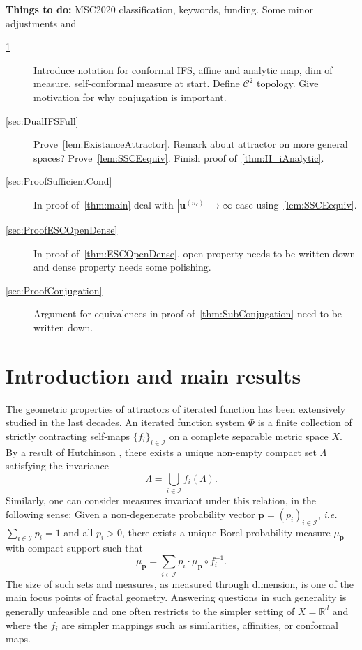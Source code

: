 \documentclass[12pt,]{article}
\theoremstyle{definition}
\theoremstyle{remark}
\newcommand{\0}{\mathbf{0}}
\newcommand{\ie}{{\it i.e.}\/ }
\newcommand{\bu}{\mathbf{u}}
\begin{document}
{{\color{blue}
\textbf{Things to do:}
MSC2020 classification, keywords, funding. Some minor adjustments and
\begin{description}
\item[\cref{sec:intro}] Introduce notation for conformal IFS, affine and analytic map, dim of measure, self-conformal measure at start. Define $\mathcal{C}^2$ topology. Give motivation for why conjugation is important. 
\item[\cref{sec:DualIFSFull}] Prove~\cref{lem:ExistanceAttractor}. Remark about attractor on more general spaces? Prove~\cref{lem:SSCEequiv}. Finish proof of~\cref{thm:H_iAnalytic}. 
\item[\cref{sec:ProofSufficientCond}] In proof of~\cref{thm:main} deal with $|\bu^{(n_\ell)}| \to \infty$ case using~\cref{lem:SSCEequiv}.
\item[\cref{sec:ProofESCOpenDense}] In proof of~\cref{thm:ESCOpenDense}, open property needs to be written down and dense property needs some polishing.
\item[\cref{sec:ProofConjugation}] Argument for equivalences in proof of~\cref{thm:SubConjugation} need to be written down.
\end{description}
}


%
%

\section{Introduction and main results} \label{sec:intro}
The geometric properties of attractors of iterated function has been extensively studied in the last
decades.
An iterated function system $\Phi$ is a finite collection of strictly contracting self-maps
$\{f_i\}_{i\in\mathcal{I}}$ on a complete separable metric space $X$. By a result of Hutchinson
\cite{Hutchinson_Attractor_81}, there exists a unique non-empty compact set $\Lambda$ satisfying the
invariance
\begin{equation}\label{eq:Hutchinson}
  \Lambda = \bigcup_{i\in\mathcal{I}} f_i(\Lambda).
\end{equation}
Similarly, one can consider measures invariant under this relation, in the following sense:
Given a non-degenerate probability vector $\mathbf{p}=(p_i)_{i\in\mathcal{I}}$, \ie
$\sum_{i\in\mathcal{I}}p_i=1$ and all $p_i>0$, there exists a unique Borel probability measure
$\mu_{\mathbf{p}}$ with compact support such that
\begin{equation*}
\mu_{\mathbf{p}}=\sum_{i \in \mathcal{I}} p_i \cdot \mu_{\mathbf{p}} \circ f_i^{-1}.
\end{equation*}
The size of such sets and measures, as measured through dimension, is one of the main focus points of fractal
geometry. Answering questions in such generality is generally unfeasible and one often restricts to
the simpler setting of $X=\mathbb{R}^d$ and where the $f_i$ are simpler mappings such as
similarities, affinities, or conformal maps.

}
\end{document}
